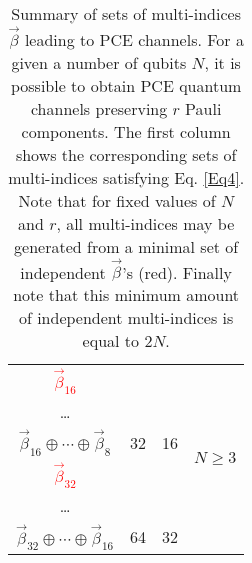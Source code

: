 \begin{table}[t]
\begin{tabular}{|c|c|c|c|}
\textcolor{red}{$\vec{\beta}_{16}$} &  &  &   \multirow{6}{*}{$N\geq 3$}                 \\ %
\dots &  &  &                    \\ %
\cellcolor{lightgray} $ \vec{\beta}_{16}\oplus \cdots \oplus \vec{\beta}_{8}$& \cellcolor{lightgray} 32 & \cellcolor{lightgray} 16 &                    \\ \cline{1-3}
\textcolor{red}{$\vec{\beta}_{32}$} &  &  &                     \\ %
\dots & &  &                    \\ %
\cellcolor{lightgray} $ \vec{\beta}_{32}\oplus \cdots \oplus \vec{\beta}_{16}$& \cellcolor{lightgray} 64 & \cellcolor{lightgray} 32 &                    \\ \cline{1-3}
\hline
\end{tabular}
\caption{Summary of sets of multi-indices $\vec{\beta}$ leading to PCE channels. For a given a number of qubits $N$, it is possible to obtain PCE quantum channels  preserving $r$ Pauli components. The first column shows the corresponding sets of multi-indices satisfying Eq. \ref{Eq4}. Note that for fixed values of $N$ and $r$, all multi-indices may be generated from a minimal set of independent $\vec{\beta}$'s (red). Finally note that this minimum amount of independent multi-indices is equal to $2N$.}
\label{table1}
\end{table}

